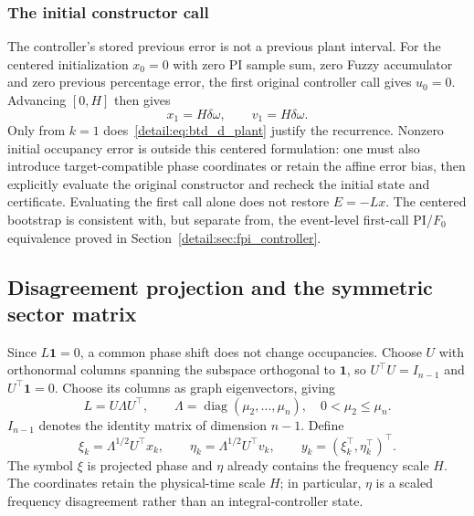 \subsubsection{The initial constructor call}
The controller's stored previous error is not a previous plant interval.
For the centered initialization $x_0=0$ with zero PI sample sum, zero
Fuzzy accumulator and zero previous percentage error, the first original
controller call gives $u_0=0$. Advancing $[0,H]$ then gives
\begin{equation}
 x_1=H\delta\omega,\qquad v_1=H\delta\omega.
 \label{detail:eq:btd_bootstrap}
\end{equation}
Only from $k=1$ does~\eqref{detail:eq:btd_d_plant} justify the recurrence.
Nonzero initial occupancy error is outside this centered formulation:
one must also introduce target-compatible phase coordinates or retain the
affine error bias, then explicitly evaluate the original constructor and
recheck the initial state and certificate. Evaluating the first call alone
does not restore $E=-Lx$. The centered bootstrap is consistent with, but separate from, the
event-level first-call PI/$F_0$ equivalence proved in Section~\ref{detail:sec:fpi_controller}.

\subsection{Disagreement projection and the symmetric sector matrix}

Since $L\mathbf1=0$, a common phase shift does not change occupancies.
Choose $U$ with orthonormal columns spanning the subspace orthogonal to
$\mathbf1$, so $U^\top U=I_{n-1}$ and $U^\top\mathbf1=0$. Choose its
columns as graph eigenvectors, giving
\begin{equation}
 L=U\Lambda U^\top,\qquad
 \Lambda=\operatorname{diag}(\mu_2,\ldots,\mu_n),\quad 0<\mu_2\le\mu_n.
 \label{detail:eq:btd_d_spectrum}
\end{equation}
$I_{n-1}$ denotes the identity matrix of dimension $n-1$. Define
\begin{equation}
 \xi_k=\Lambda^{1/2}U^\top x_k,\qquad
 \eta_k=\Lambda^{1/2}U^\top v_k,\qquad y_k=(\xi_k^\top,\eta_k^\top)^\top.
 \label{detail:eq:btd_projection}
\end{equation}
The symbol $\xi$ is projected phase and $\eta$ already contains the
frequency scale $H$. The coordinates retain the physical-time scale $H$; in particular,
$\eta$ is a scaled frequency disagreement rather than an integral-controller state.

